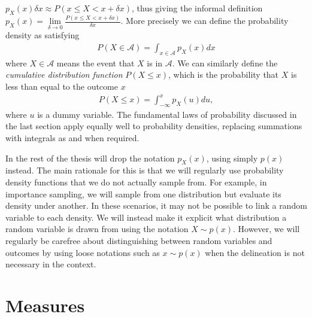 $p_{X}(x)\delta x \approx P(x\le X <x+\delta x)$, thus giving the informal definition
$p_{X}(x) = \lim\limits_{\delta\rightarrow0} \frac{P(x\le X <x+\delta x)}{\delta x}$.  More 
precisely we can define the probability density as satisfying
\begin{align}
\label{eq:prob:density}
P(X\in \mathcal{A}) = \int_{x\in\mathcal{A}} p_{X}(x) dx
\end{align}
where $X\in \mathcal{A}$ means the event that $X$ is in $\mathcal{A}$.  We can similarly
define the \emph{cumulative distribution function} $P(X\le x)$, which is the probability
that $X$ is less than equal to the outcome $x$
\begin{align}
\label{eq:prob:cumulative}
P(X\le x) = \int_{-\infty}^{x} p_{X}(u) du,
\end{align}
where $u$ is a dummy variable.  The fundamental laws of probability discussed in the last
section apply equally well to probability densities, replacing summations with integrals
as and when required.

In the rest of the thesis will drop the notation $p_{X}(x)$, using simply $p(x)$ instead.
The main rationale for this is that we will regularly use probability density functions that we do
not actually sample from.  For example, in importance sampling, we will sample from one
distribution but evaluate its density under another.  In these scenarios, it may not be possible
to link a random variable to each density.  We will instead make it explicit what distribution
a random variable is drawn from using the notation $X\sim p(x)$.  
However, we will regularly be carefree about
distinguishing between random variables and outcomes by using loose notations such as
$x\sim p(x)$ when the delineation is not necessary in the context.


\section{Measures}
\label{sec:prob:measure}

